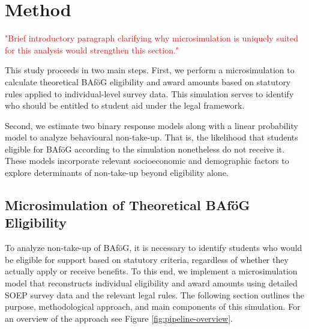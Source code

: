 %
%



\section{Method} 

\textcolor{red}{"Brief introductory paragraph clarifying why microsimulation is uniquely suited for this analysis would strengthen this section."}

This study proceeds in two main steps. 
First, we perform a microsimulation to calculate theoretical BAföG eligibility and award amounts based on statutory rules applied to individual-level survey data. 
This simulation serves to identify who should be entitled to student aid under the legal framework.

Second, we estimate two binary response models along with a linear probability model to analyze behavioural non-take-up.
That is, the likelihood that students eligible for BAföG according to the simulation nonetheless do not receive it. 
These models incorporate relevant socioeconomic and demographic factors to explore determinants of non-take-up beyond eligibility alone.

%
%
\subsection{Microsimulation of Theoretical BAföG Eligibility} 
To analyze non-take-up of BAföG, it is necessary to identify students who would be eligible for support based on statutory criteria, regardless of whether they actually apply or receive benefits. 
To this end, we implement a microsimulation model that reconstructs individual eligibility and award amounts using detailed SOEP survey data and the relevant legal rules.
The following section outlines the purpose, methodological approach, and main components of this simulation. 
For an overview of the approach see Figure \ref{fig:pipeline-overview}.

